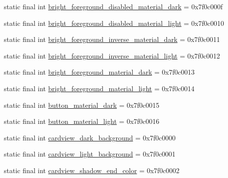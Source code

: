 \begin{CompactItemize}
\item 
static final int \hyperlink{classandroid_1_1support_1_1graphics_1_1drawable_1_1animated_1_1_r_1_1color_fdb3551a6322aed06e3d6177ccdff49d}{bright\_\-foreground\_\-disabled\_\-material\_\-dark} = 0x7f0c000f
\item 
static final int \hyperlink{classandroid_1_1support_1_1graphics_1_1drawable_1_1animated_1_1_r_1_1color_7713df7cb35d5fe69268cc414f995768}{bright\_\-foreground\_\-disabled\_\-material\_\-light} = 0x7f0c0010
\item 
static final int \hyperlink{classandroid_1_1support_1_1graphics_1_1drawable_1_1animated_1_1_r_1_1color_67d505e129f08d0d57ebc016cedf3bd7}{bright\_\-foreground\_\-inverse\_\-material\_\-dark} = 0x7f0c0011
\item 
static final int \hyperlink{classandroid_1_1support_1_1graphics_1_1drawable_1_1animated_1_1_r_1_1color_18c789030306fd7470dd90778eadfa83}{bright\_\-foreground\_\-inverse\_\-material\_\-light} = 0x7f0c0012
\item 
static final int \hyperlink{classandroid_1_1support_1_1graphics_1_1drawable_1_1animated_1_1_r_1_1color_f9833b52e1b5f9f0c8ba69519bb4964f}{bright\_\-foreground\_\-material\_\-dark} = 0x7f0c0013
\item 
static final int \hyperlink{classandroid_1_1support_1_1graphics_1_1drawable_1_1animated_1_1_r_1_1color_c29c7bceb75a27ef828d39029261a841}{bright\_\-foreground\_\-material\_\-light} = 0x7f0c0014
\item 
static final int \hyperlink{classandroid_1_1support_1_1graphics_1_1drawable_1_1animated_1_1_r_1_1color_4cb11c1641c0747021bbfef3cefc2a6f}{button\_\-material\_\-dark} = 0x7f0c0015
\item 
static final int \hyperlink{classandroid_1_1support_1_1graphics_1_1drawable_1_1animated_1_1_r_1_1color_79ba7c6bf141312441e2eaf12e1b486b}{button\_\-material\_\-light} = 0x7f0c0016
\item 
static final int \hyperlink{classandroid_1_1support_1_1graphics_1_1drawable_1_1animated_1_1_r_1_1color_81fd1372381b801ed2a7e70790d95c59}{cardview\_\-dark\_\-background} = 0x7f0c0000
\item 
static final int \hyperlink{classandroid_1_1support_1_1graphics_1_1drawable_1_1animated_1_1_r_1_1color_c8f4a6a3d2dce80fc6d448612d585c96}{cardview\_\-light\_\-background} = 0x7f0c0001
\item 
static final int \hyperlink{classandroid_1_1support_1_1graphics_1_1drawable_1_1animated_1_1_r_1_1color_19b114de2d7813f63a1ae504e07c56ad}{cardview\_\-shadow\_\-end\_\-color} = 0x7f0c0002

\end{CompactItemize}
